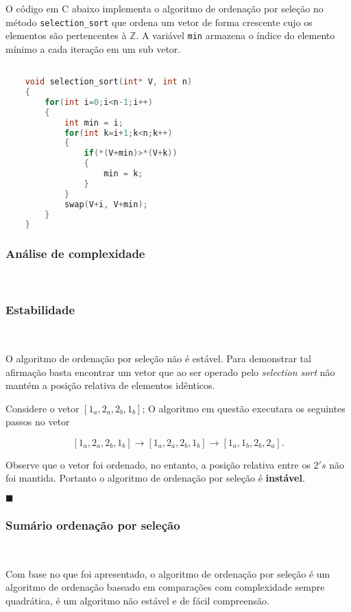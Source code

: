 O código em C abaixo implementa o algoritmo de ordenação por seleção no método \texttt{selection\_sort} que ordena um vetor de forma crescente cujo os elementos são pertencentes à $\mathbb{Z}$. A variável \texttt{min} armazena o índice do elemento mínimo a cada iteração em um sub vetor.

\begin{lstlisting}[language=C, frame=single]

    void selection_sort(int* V, int n)
    {
        for(int i=0;i<n-1;i++)
        {
            int min = i;
            for(int k=i+1;k<n;k++)
            {
                if(*(V+min)>*(V+k))
                {
                    min = k;
                }
            }
            swap(V+i, V+min);
        }
    }  
\end{lstlisting}

\subsubsection{Análise de complexidade}
\

\subsubsection{Estabilidade}
\

O algoritmo de ordenação por seleção não é estável. Para demonstrar tal afirmação basta encontrar um vetor que ao ser operado pelo \textit{selection sort} não mantém a posição relativa de elementos idênticos.

Considere o vetor $[1_a, 2_a, 2_b, 1_b]$; O algoritmo em questão executara os seguintes passos no vetor

\[[1_a, 2_a, 2_b, 1_b]\rightarrow[1_a, 2_a, 2_b, 1_b]\rightarrow[1_a, 1_b, 2_b, 2_a].\]

Observe que o vetor foi ordenado, no entanto, a posição relativa entre os $2's$ não foi mantida. Portanto o algoritmo de ordenação por seleção é \textbf{instável}.

{\raggedleft $\blacksquare $ \par}

\subsubsection{Sumário ordenação por seleção}
\ 

Com base no que foi apresentado, o algoritmo de ordenação por seleção é um algoritmo de ordenação baseado em comparações com complexidade sempre quadrática, é um algoritmo não estável e de fácil compreensão.


